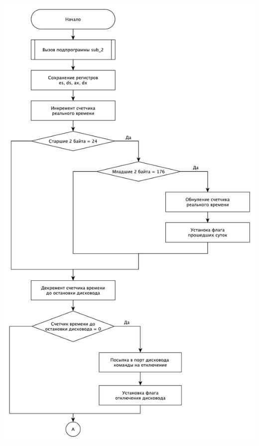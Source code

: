 ﻿\documentclass[a4paper,12pt]{article}
\begin{document}
    \begin{center}
        \includegraphics[scale=0.6]{int8h_1}
    \end{center}
\end{document}

